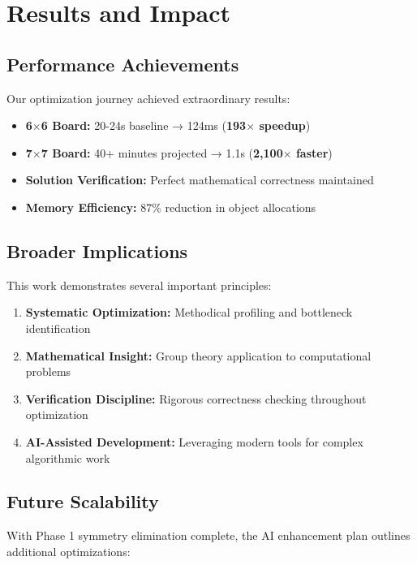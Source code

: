 \documentclass[12pt,a4paper]{article}
\theoremstyle{definition}
\begin{document}
\section{Results and Impact}

\subsection{Performance Achievements}

Our optimization journey achieved extraordinary results:

\begin{itemize}
\item \textbf{6$\times$6 Board:} 20-24s baseline → 124ms (\textbf{193$\times$ speedup})
\item \textbf{7$\times$7 Board:} 40+ minutes projected → 1.1s (\textbf{2,100$\times$ faster})
\item \textbf{Solution Verification:} Perfect mathematical correctness maintained
\item \textbf{Memory Efficiency:} 87\% reduction in object allocations
\end{itemize}

\subsection{Broader Implications}

This work demonstrates several important principles:

\begin{enumerate}
\item \textbf{Systematic Optimization:} Methodical profiling and bottleneck identification
\item \textbf{Mathematical Insight:} Group theory application to computational problems  
\item \textbf{Verification Discipline:} Rigorous correctness checking throughout optimization
\item \textbf{AI-Assisted Development:} Leveraging modern tools for complex algorithmic work
\end{enumerate}

\subsection{Future Scalability}

With Phase 1 symmetry elimination complete, the AI enhancement plan outlines additional optimizations:
\end{document}
